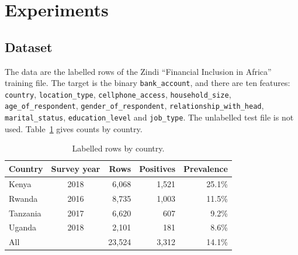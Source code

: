 \documentclass[11pt]{article}
\begin{document}
\section{Experiments}
\label{sec:experiments}

\subsection{Dataset}

The data are the labelled rows of the Zindi ``Financial Inclusion in Africa'' training file. The target is the binary \texttt{bank\_account}, and there are ten features: \texttt{country}, \texttt{location\_type}, \texttt{cellphone\_access}, \texttt{household\_size}, \texttt{age\_of\_respondent}, \texttt{gender\_of\_respondent}, \texttt{relationship\_with\_head}, \texttt{marital\_status}, \texttt{education\_level} and \texttt{job\_type}. The unlabelled test file is not used. Table~\ref{tab:data} gives counts by country.

\begin{table}[H]
  \centering
  \caption{Labelled rows by country.}
  \label{tab:data}
  \begin{tabular}{lcrrr}
    \toprule
    Country & Survey year & Rows & Positives & Prevalence \\
    \midrule
    Kenya    & 2018 & 6,068 & 1,521 & 25.1\% \\
    Rwanda   & 2016 & 8,735 & 1,003 & 11.5\% \\
    Tanzania & 2017 & 6,620 &   607 &  9.2\% \\
    Uganda   & 2018 & 2,101 &   181 &  8.6\% \\
    \midrule
    All      &      & 23,524 & 3,312 & 14.1\% \\
    \bottomrule
  \end{tabular}
\end{table}
\end{document}
